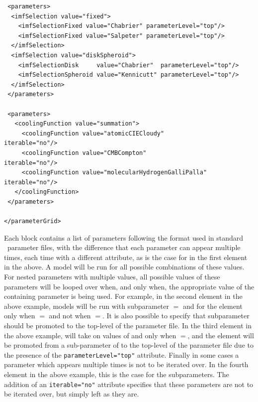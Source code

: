 \begin{verbatim}
 <parameters>
  <imfSelection value="fixed">
    <imfSelectionFixed value="Chabrier" parameterLevel="top"/>
    <imfSelectionFixed value="Salpeter" parameterLevel="top"/>
  </imfSelection>
  <imfSelection value="diskSpheroid">
    <imfSelectionDisk     value="Chabrier"  parameterLevel="top"/>
    <imfSelectionSpheroid value="Kennicutt" parameterLevel="top"/>
  </imfSelection>
 </parameters>

 <parameters>
   <coolingFunction value="summation">
     <coolingFunction value="atomicCIECloudy"             iterable="no"/>
     <coolingFunction value="CMBCompton"                  iterable="no"/>
     <coolingFunction value="molecularHydrogenGalliPalla" iterable="no"/>
   </coolingFunction>
 </parameters>

</parameterGrid>
\end{verbatim}
Each  block contains a list of parameters following the format used in standard \glc\ parameter files, with the difference that each parameter can appear multiple times, each time with a different  attribute, as is the case for  in the first  element in the above. A model will be run for all possible combinations of these values. For nested parameters with multiple values, all possible values of these parameters will be looped over when, and only when, the appropriate value of the containing parameter is being used. For example, in the second  element in the above example, models will be run with subparameter \mono{[exponent]}$=$ and  for the  element only when \mono{[starFormationFeedbackDisks]}$=$ and not when \mono{[starFormationFeedbackDisks]}$=$. It is also possible to specify that subparameter should be promoted to the top-level of the parameter file. In the third  element in the above example,  will take on values of  and  only when $=$, and the  element will be promoted from a sub-parameter of  to the top-level of the parameter file due to the presence of the \verb|parameterLevel="top"| attribute. Finally in some cases a parameter which appears multiple times is not to be iterated over. In the fourth  element in the above example, this is the case for the  subparameters. The addition of an \verb|iterable="no"| attribute specifies that these parameters are not to be iterated over, but simply left as they are.

